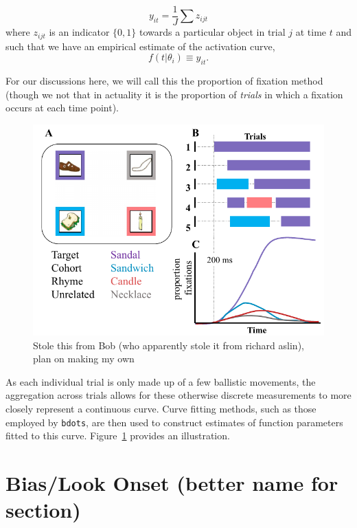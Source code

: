 \documentclass{article}
\newcommand{\xt}{\texttt}%
\begin{document}
\begin{equation}\label{eq:sum_proportions}
y_{it} = \frac1J \sum z_{ijt}
\end{equation}
where $z_{ijt}$ is an indicator $\{0, 1\}$  towards a particular object in trial $j$ at time $t$ and such that we have an empirical estimate of the activation curve,
\begin{equation}\label{eq:empir_to_activation}
f(t | \theta_i) \equiv y_{it}.
\end{equation}



For our discussions here, we will call this the proportion of fixation method (though we not that in actuality it is the proportion of \textit{trials} in which a fixation occurs at each time point).


\begin{figure}[H]
\centering
\includegraphics[scale=0.45]{bob_vwp_full.png}
\caption{Stole this from Bob (who apparently stole it from richard aslin), plan on making my own}
\label{fig:bob_diagram_full}
\end{figure}


As each individual trial is only made up of a few ballistic movements, the aggregation across trials allows for these otherwise discrete measurements to more closely represent a continuous curve. Curve fitting methods, such as those employed by \xt{bdots}, are then used to construct estimates of function parameters fitted to this curve. Figure~\ref{fig:bob_diagram_full} provides an illustration.

\section{Bias/Look Onset (better name for section)} 
\end{document}
